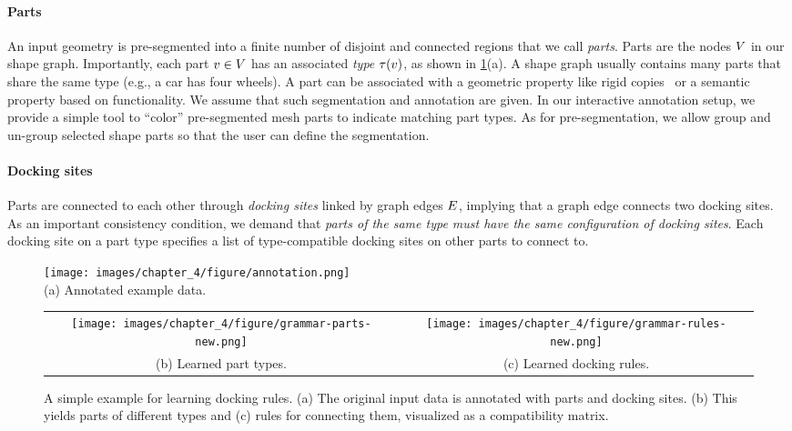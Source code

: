 \paragraph{Parts} An input geometry is pre-segmented into a finite number of disjoint and connected regions that we call \emph{parts}. Parts are the nodes $V$ in our shape graph. Importantly, each part $v \in V$ has an associated \emph{type} $\tau(v)$, as shown in \ref{fig:annotation}(a).
A shape graph usually contains many parts that share the same type (e.g., a car has four wheels).
A part can be associated with a geometric property like rigid copies~\cite{Bokeloh2010} or a semantic property based on functionality.
We assume that such segmentation and annotation are given. In our interactive annotation setup, we provide a simple tool to ``color'' pre-segmented mesh parts to indicate matching part types. As for pre-segmentation, we allow group and un-group selected shape parts so that the user can define the segmentation.

\paragraph{Docking sites} Parts are connected to each other through \emph{docking sites} linked by graph edges $E$, implying that a graph edge connects two docking sites. As an important consistency condition, we demand that \emph{parts of the same type must have the same configuration of docking sites}. Each docking site on a part type specifies a list of type-compatible docking sites on other parts to connect to.

\begin{figure}
	\centering
		\texttt{[image: images/chapter\_4/figure/annotation.png]}\\
		\small (a) Annotated example data. \\
		\begin{tabular}{cc}
		\texttt{[image: images/chapter\_4/figure/grammar-parts-new.png]} &
		\texttt{[image: images/chapter\_4/figure/grammar-rules-new.png]} \\		
		\small (b) Learned part types. &
		\small (c) Learned docking rules.\\
		\end{tabular}
	\caption{A simple example for learning docking rules. (a) The original input data is annotated with parts and docking sites. (b) This yields parts of different types and (c) rules for connecting them, visualized as a compatibility matrix.}
	\label{fig:annotation}
\vnudge
\end{figure}

